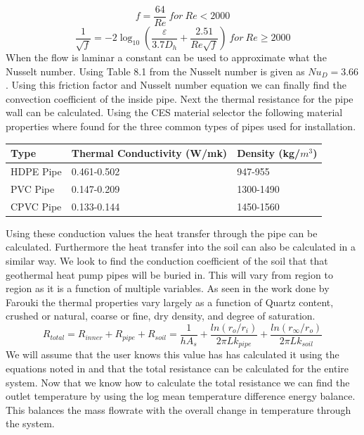 %
\begin{equation}
    f = \frac{64}{Re}\ for\ Re < 2000
\end{equation}
\begin{equation}
    \frac { 1 }{ \sqrt { f }  } =-2\log _{ 10 } \left( \frac { \varepsilon  }{ 3.7D_{ h } } +\frac { 2.51 }{ { Re }\sqrt { f }  }  \right)\ for\ Re \geq 2000
\end{equation}
%
When the flow is laminar a constant can be used to approximate what the Nusselt number. Using Table 8.1 from \cite{bergman2011fundamentals} the Nusselt number is given as ${ N }u_{ D }=3.66$. Using this friction factor and Nusselt number equation we can finally find the convection coefficient of the inside pipe. Next the thermal resistance for the pipe wall can be calculated. Using the CES material selector \cite{ces} the following material properties where found for the three common types of pipes used for installation.
%
\begin{table}[H]
\centering
\begin{tabular}{lll}
Type       & Thermal Conductivity (W/mk) & Density (kg/$m^3$) \\ \hline
HDPE Pipe  & 0.461-0.502                 & 947-955                          \\
PVC Pipe   & 0.147-0.209                 & 1300-1490                        \\
CPVC Pipe  & 0.133-0.144                 & 1450-1560                       
\end{tabular}
\end{table}
%
\noindent
Using these conduction values the heat transfer through the pipe can be calculated. Furthermore the heat transfer into the soil can also be calculated in a similar way. We look to find the conduction coefficient of the soil that that geothermal heat pump pipes will be buried in. This will vary from region to region as it is a function of multiple variables. As seen in the work done by Farouki \cite{farouki1981thermal} the thermal properties vary largely as a function of Quartz content, crushed or natural, coarse or fine, dry density, and degree of saturation. %
\begin{equation}
    { R }_{ total }={ R }_{ inner }+{ R }_{ pipe }+{ R }_{ soil }=\frac { 1 }{ h{ A }_{ s } } +\frac { ln({ { r }_{ o } }/{ { r }_{ i } }) }{ { 2\pi Lk }_{ pipe } } +\frac { ln({ { r }_{ \infty  } }/{ { r }_{ o } }) }{ { 2\pi Lk }_{ soil } } 
\end{equation}
%
We will assume that the user knows this value has has calculated it using the equations noted in \cite{farouki1981thermal} and that the total resistance can be calculated for the entire system. Now that we know how to calculate the total resistance we can find the outlet temperature by using the log mean temperature difference energy balance. This balances the mass flowrate with the overall change in temperature through the system.
